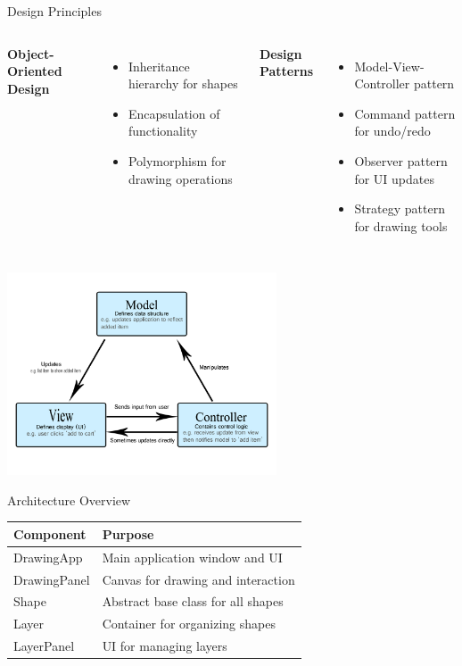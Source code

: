 \documentclass{beamer}
\begin{document}
\begin{frame}{Design Principles}
\begin{columns}
\textbf{Object-Oriented Design}
\begin{itemize}
\item Inheritance hierarchy for shapes
\item Encapsulation of functionality
\item Polymorphism for drawing operations
\end{itemize}

\textbf{Design Patterns}
\begin{itemize}
\item Model-View-Controller pattern
\item Command pattern for undo/redo
\item Observer pattern for UI updates
\item Strategy pattern for drawing tools
\end{itemize}
\end{columns}

\vspace{0.5cm}
\begin{center}
\includegraphics[width=0.6\textwidth]{images/model-view-controller-light-blue.png}
\end{center}
\end{frame}

\begin{frame}{Architecture Overview}
\begin{center}
\begin{tabular}{|l|l|}
\hline
\textbf{Component} & \textbf{Purpose} \\
\hline
DrawingApp & Main application window and UI \\
\hline
DrawingPanel & Canvas for drawing and interaction \\
\hline
Shape & Abstract base class for all shapes \\
\hline
Layer & Container for organizing shapes \\
\hline
LayerPanel & UI for managing layers \\
\hline
\end{tabular}
\end{center}
\end{frame}
\end{document}
